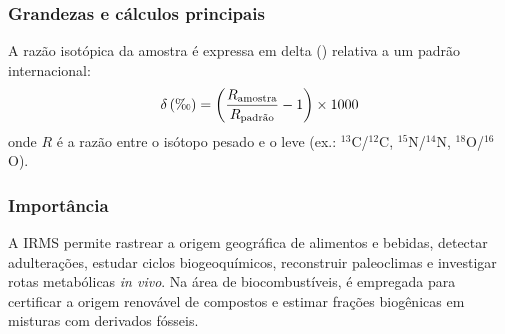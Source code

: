 \subsubsection*{Grandezas e cálculos principais}

A razão isotópica da amostra é expressa em delta (\textperthousand)
relativa a um padrão internacional:
\begin{equation}
    \delta\,(\text{\textperthousand}) =
    \left(\frac{R_{\text{amostra}}}{R_{\text{padrão}}} - 1\right) \times 1000
\end{equation}
onde $R$ é a razão entre o isótopo pesado e o leve (ex.: $^{13}$C/$^{12}$C,
$^{15}$N/$^{14}$N, $^{18}$O/$^{16}$O).

\subsubsection*{Importância}

A IRMS permite rastrear a origem geográfica de alimentos e bebidas,
detectar adulterações, estudar ciclos biogeoquímicos, reconstruir paleoclimas
e investigar rotas metabólicas \textit{in vivo}. Na área de biocombustíveis,
é empregada para certificar a origem renovável de compostos e estimar
frações biogênicas em misturas com derivados fósseis.
